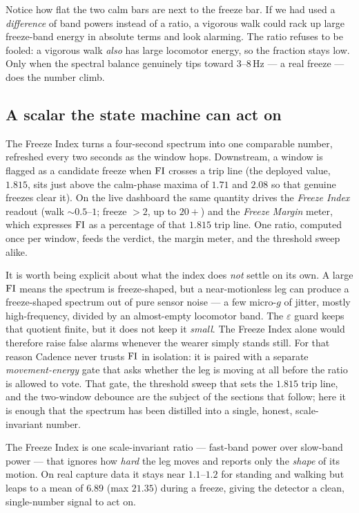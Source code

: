 \begin{intuition}
Notice how flat the two calm bars are next to the freeze bar. If we had used a
\emph{difference} of band powers instead of a ratio, a vigorous walk could rack up
large freeze-band energy in absolute terms and look alarming. The ratio refuses to be
fooled: a vigorous walk \emph{also} has large locomotor energy, so the fraction stays
low. Only when the spectral balance genuinely tips toward 3--8\,Hz --- a real freeze
--- does the number climb.
\end{intuition}

\subsection{A scalar the state machine can act on}

The Freeze Index turns a four-second spectrum into one comparable number, refreshed
every two seconds as the window hops. Downstream, a window is flagged as a candidate
freeze when $\mathrm{FI}$ crosses a trip line (the deployed value, $1.815$, sits just above
the calm-phase maxima of $1.71$ and $2.08$ so that genuine freezes clear it). On the
live dashboard the same quantity drives the \emph{Freeze Index} readout (walk
$\sim\!0.5$--$1$; freeze $>2$, up to $20{+}$) and the \emph{Freeze Margin} meter, which
expresses $\mathrm{FI}$ as a percentage of that $1.815$ trip line. One ratio, computed once
per window, feeds the verdict, the margin meter, and the threshold sweep alike.

It is worth being explicit about what the index does \emph{not} settle on its own. A
large $\mathrm{FI}$ means the spectrum is freeze-shaped, but a near-motionless leg can produce
a freeze-shaped spectrum out of pure sensor noise --- a few micro-$g$ of jitter, mostly
high-frequency, divided by an almost-empty locomotor band. The $\varepsilon$ guard
keeps that quotient finite, but it does not keep it \emph{small}. The Freeze Index
alone would therefore raise false alarms whenever the wearer simply stands still. For
that reason Cadence never trusts $\mathrm{FI}$ in isolation: it is paired with a separate
\emph{movement-energy} gate that asks whether the leg is moving at all before the ratio
is allowed to vote. That gate, the threshold sweep that sets the $1.815$ trip line, and
the two-window debounce are the subject of the sections that follow; here it is enough
that the spectrum has been distilled into a single, honest, scale-invariant number.

\begin{takeaway}
The Freeze Index is one scale-invariant ratio --- fast-band power over slow-band power
--- that ignores how \emph{hard} the leg moves and reports only the \emph{shape} of its
motion. On real capture data it stays near $1.1$--$1.2$ for standing and walking but
leaps to a mean of $6.89$ (max $21.35$) during a freeze, giving the detector a clean,
single-number signal to act on.
\end{takeaway}

